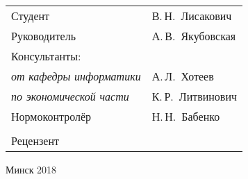 \begin{titlepage}
\begin{center}
    \begin{tabular}{ p{}p{} }
      Студент & В.\,Н.~Лисакович \\
      Руководитель & А.\,В.~Якубовская \\
      Консультанты: &\\
      \hspace*{3ex}\emph{от кафедры информатики} & А.\,Л.~Хотеев \\
      \hspace*{3ex}\emph{по экономической части} & К.\,Р.~Литвинович \\
      Нормоконтролёр & Н.\,Н.~Бабенко\\
      & \\
      Рецензент %
    \end{tabular}
    
    \vfill
    {\normalsize Минск 2018}
  \end{center}
\end{titlepage}
